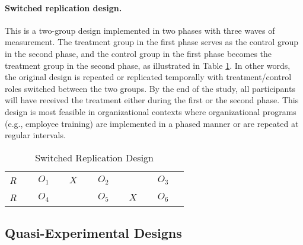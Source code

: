 \paragraph{Switched replication design.} This is a two-group design implemented in two phases with three waves of measurement. The treatment group in the first phase serves as the control group in the second phase, and the control group in the first phase becomes the treatment group in the second phase, as illustrated in Table \ref{09:tab07}. In other words, the original design is repeated or replicated temporally with treatment/control roles switched between the two groups. By the end of the study, all participants will have received the treatment either during the first or the second phase. This design is most feasible in organizational contexts where organizational programs (e.g., employee training) are implemented in a phased manner or are repeated at regular intervals.

\begin{table}[H]
	\centering
	\begin{tabularx}{0.75\linewidth}{p{0.10\linewidth}p{0.10\linewidth}p{0.10\linewidth}p{0.10\linewidth}p{0.10\linewidth}p{0.10\linewidth}}
		\toprule
		\textit{R} & $ O_1 $ & $ X $ & $ O_2 $ &       & $ O_3 $ \\
		\textit{R} & $ O_4 $ &       & $ O_5 $ & $ X $ & $ O_6 $ \\
		\bottomrule
	\end{tabularx}
	\caption{Switched Replication Design}
	\label{09:tab07}
\end{table}

\subsection{Quasi-Experimental Designs}

